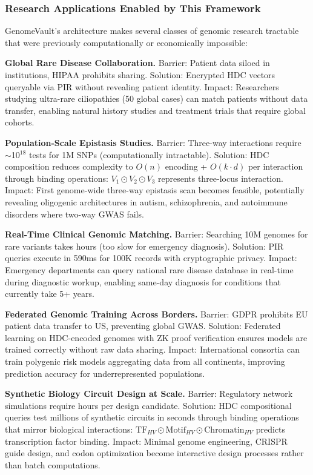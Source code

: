 \documentclass[11pt,letterpaper]{article}
\begin{document}
\subsubsection{Research Applications Enabled by This Framework}

GenomeVault's architecture makes several classes of genomic research tractable that were previously computationally or economically impossible:

\textbf{Global Rare Disease Collaboration.} Barrier: Patient data siloed in institutions, HIPAA prohibits sharing. Solution: Encrypted HDC vectors queryable via PIR without revealing patient identity. Impact: Researchers studying ultra-rare ciliopathies (50 global cases) can match patients without data transfer, enabling natural history studies and treatment trials that require global cohorts.

\textbf{Population-Scale Epistasis Studies.} Barrier: Three-way interactions require $\sim$10$^{18}$ tests for 1M SNPs (computationally intractable). Solution: HDC composition reduces complexity to $O(n)$ encoding + $O(k \cdot d)$ per interaction through binding operations: $V_1 \odot V_2 \odot V_3$ represents three-locus interaction. Impact: First genome-wide three-way epistasis scan becomes feasible, potentially revealing oligogenic architectures in autism, schizophrenia, and autoimmune disorders where two-way GWAS fails.

\textbf{Real-Time Clinical Genomic Matching.} Barrier: Searching 10M genomes for rare variants takes hours (too slow for emergency diagnosis). Solution: PIR queries execute in 590ms for 100K records with cryptographic privacy. Impact: Emergency departments can query national rare disease database in real-time during diagnostic workup, enabling same-day diagnosis for conditions that currently take 5+ years.

\textbf{Federated Genomic Training Across Borders.} Barrier: GDPR prohibits EU patient data transfer to US, preventing global GWAS. Solution: Federated learning on HDC-encoded genomes with ZK proof verification ensures models are trained correctly without raw data sharing. Impact: International consortia can train polygenic risk models aggregating data from all continents, improving prediction accuracy for underrepresented populations.

\textbf{Synthetic Biology Circuit Design at Scale.} Barrier: Regulatory network simulations require hours per design candidate. Solution: HDC compositional queries test millions of synthetic circuits in seconds through binding operations that mirror biological interactions: $\text{TF}_{HV} \odot \text{Motif}_{HV} \odot \text{Chromatin}_{HV}$ predicts transcription factor binding. Impact: Minimal genome engineering, CRISPR guide design, and codon optimization become interactive design processes rather than batch computations.
\end{document}
